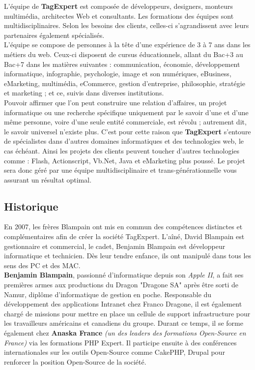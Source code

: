 \documentclass{article}
\begin{document}
\begin{sffamily}
L’équipe de \textbf{TagExpert} est composée de développeurs, designers, monteurs multimédia, architectes Web et consultants. Les formations des équipes sont 
multidisciplinaires. Selon les besoins des clients, celles-ci s’agrandissent avec leurs partenaires également spécialisés.\\
L'équipe se compose de personnes à la tête d’une expérience de 3 à 7 ans dans les métiers du web. Ceux-ci disposent de cursus éducationnels, allant du Bac+3 au Bac+7 dans 
les matières suivantes : communication, économie, développement informatique, infographie, psychologie, image et son numériques, eBusiness, eMarketing, multimédia, 
eCommerce, gestion d’entreprise, philosophie, stratégie et marketing ; et ce, suivis dans diverses institutions. \\

Pouvoir affirmer que l'on peut construire une relation d'affaires, un projet informatique ou une recherche spécifique uniquement par le savoir d'une et d'une même personne, 
voire d’une seule entité commerciale, est révolu ; autrement dit, le savoir universel n'existe plus. C'est pour cette raison que \textbf{TagExpert} s'entoure de spécialistes 
dans d'autres domaines informatiques et des technologies web, le cas échéant. Ainsi les projets des clients peuvent toucher d’autres technologies comme : Flash, 
Actionscript, Vb.Net, Java et eMarketing plus poussé. Le projet sera donc géré par une équipe multidisciplinaire et trans-générationnelle vous assurant un résultat optimal.

\subsection{Historique}

En 2007, les frères Blampain ont mis en commun des compétences distinctes et complémentaires afin de créer la société TagExpert. L'aîné, David Blampain est gestionnaire et 
commercial, le cadet, Benjamin Blampain est développeur informatique et technicien. Dès leur tendre enfance, ils ont manipulé dans tous les sens des PC et des MAC. \\

\textbf{Benjamin Blampain}, passionné d'informatique depuis son \textit{Apple II}, a fait ses premières armes aux productions du Dragon "Dragone SA" après être sorti de 
Namur, diplôme d'informatique de gestion en poche. Responsable du développement des applications Intranet chez Franco Dragone, il est également chargé de missions pour 
mettre en place un cellule de support infrastructure pour les travailleurs américains et canadiens du groupe. Durant ce temps, il se forme également chez 
\textbf{Anaska France} \textit{(un des leaders des formations Open-Source en France)} via les formations PHP Expert.
Il participe ensuite à des conférences internationales sur les outils Open-Source comme CakePHP, Drupal pour renforcer la position Open-Source de la société. \\


\end{sffamily}
\end{document}
